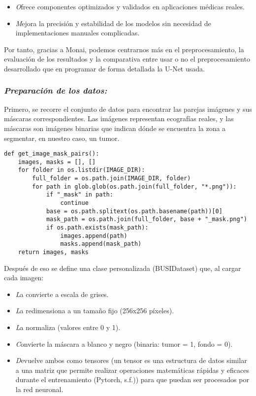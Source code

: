 \documentclass[12pt]{article}
\begin{document}
\begin{itemize}
\begin{itemize}
\begin{itemize}
                \item \textit Ofrece componentes optimizados y validados en aplicaciones médicas reales.
                \item \textit  Mejora la precisión y estabilidad de los modelos sin necesidad de implementaciones manuales complicadas.
            \end{itemize}
        Por tanto, gracias a Monai, podemos centrarnos más en el preprocesamiento, la evaluación de los resultados y la comparativa entre usar o no el preprocesamiento desarrollado que en programar de forma detallada la U-Net usada.
        \end{itemize}
\end{itemize}
\subsubsection{\textit{Preparación de los datos:}}
Primero, se recorre el conjunto de datos para encontrar las parejas imágenes y sus máscaras correspondientes. Las imágenes representan ecografías reales, y las máscaras son imágenes binarias que indican dónde se encuentra la zona a segmentar, en nuestro caso, un tumor. 
\begin{lstlisting}[caption={Buscar parejas de imágenes y máscaras}, label=lst:getpairs]
def get_image_mask_pairs():
    images, masks = [], []
    for folder in os.listdir(IMAGE_DIR):
        full_folder = os.path.join(IMAGE_DIR, folder)
        for path in glob.glob(os.path.join(full_folder, "*.png")):
            if "_mask" in path:
                continue
            base = os.path.splitext(os.path.basename(path))[0]
            mask_path = os.path.join(full_folder, base + "_mask.png")
            if os.path.exists(mask_path):
                images.append(path)
                masks.append(mask_path)
    return images, masks
\end{lstlisting}
Después de eso se define una clase personalizada (BUSIDataset) que,  al cargar cada imagen:
\begin{itemize}
    \item \textit La convierte a escala de grises.
    \item \textit La redimensiona a un tamaño fijo (256x256 píxeles).
    \item \textit La normaliza (valores entre 0 y 1).
    \item \textit Convierte la máscara a blanco y negro (binaria: tumor = 1, fondo = 0).
    \item \textit Devuelve ambos como tensores (un tensor es una estructura de datos similar a una matriz que permite realizar operaciones matemáticas rápidas y eficaces durante el entrenamiento (Pytorch, s.f.)) para que puedan ser procesados por la red neuronal.
\end{itemize}
\end{document}
